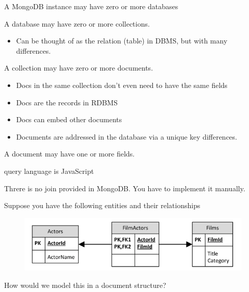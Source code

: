 \documentclass{beamer}
\begin{document}
\begin{slide}{
\item A MongoDB instance may have zero or more databases
\item A database may have zero or more collections.
\begin{itemize}
	\item Can be thought of as the relation (table) in DBMS, but with many differences.
\end{itemize}
\item A collection may have zero or more documents.
\pause
\begin{itemize}
	\item Docs in the same collection don’t even need to have the same
fields
	\item Docs are the records in RDBMS
	\item Docs can embed other documents
	\item Documents are addressed in the database via a unique key differences.
\end{itemize}
\pause
\item A document may have one or more fields.
\item query language is JavaScript
\item Threre is no join provided in MongoDB. You have to implement it manually.
}\end{slide}



\begin{slide}{
\item Suppose you have the following entities and their relationships
\begin{figure}
		\includegraphics[scale=0.3]{img/mongo-relational}
\end{figure}
\item How would we model this in a document structure?
}\end{slide}
\end{document}
